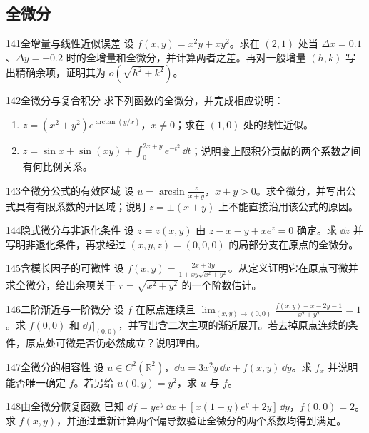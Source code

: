 \subsection{全微分}
\begin{exercise}{141}{全增量与线性近似误差}
设 $f(x,y)=x^2y+xy^2$。求在 $(2,1)$ 处当 $\Delta x=0.1$、$\Delta y=-0.2$ 时的全增量和全微分，并计算两者之差。再对一般增量 $(h,k)$ 写出精确余项，证明其为 $o(\sqrt{h^2+k^2})$。
\end{exercise}
\begin{exercise}{142}{全微分与复合积分}
求下列函数的全微分，并完成相应说明：
\begin{enumerate}
\item $z=(x^2+y^2)e^{\arctan(y/x)}$，$x\ne0$；求在 $(1,0)$ 处的线性近似。
\item $z=\sin x+\sin(xy)+\int_0^{2x+y}e^{-t^2}\,\dd t$；说明变上限积分贡献的两个系数之间有何比例关系。
\end{enumerate}
\end{exercise}
\begin{exercise}{143}{全微分公式的有效区域}
设 $u=\arcsin\frac z{x+y}$，$x+y>0$。求全微分，并写出公式具有有限系数的开区域；说明 $z=\pm(x+y)$ 上不能直接沿用该公式的原因。
\end{exercise}
\begin{exercise}{144}{隐式微分与非退化条件}
设 $z=z(x,y)$ 由 $z-x-y+xe^z=0$ 确定。求 $\dd z$ 并写明非退化条件，再求经过 $(x,y,z)=(0,0,0)$ 的局部分支在原点的全微分。
\end{exercise}
\begin{exercise}{145}{含模长因子的可微性}
设 $f(x,y)=\frac{2x+3y}{1+xy\sqrt{x^2+y^2}}$。从定义证明它在原点可微并求全微分，给出余项关于 $r=\sqrt{x^2+y^2}$ 的一个阶数估计。
\end{exercise}
\begin{exercise}{146}{二阶渐近与一阶微分}
设 $f$ 在原点连续且 $\lim_{(x,y)\to(0,0)}\frac{f(x,y)-x-2y-1}{x^2+y^2}=1$。求 $f(0,0)$ 和 $\dd f|_{(0,0)}$，并写出含二次主项的渐近展开。若去掉原点连续的条件，原点处可微是否仍必然成立？说明理由。
\end{exercise}
\begin{exercise}{147}{全微分的相容性}
设 $u\in C^2(\mathbb R^2)$，$\dd u=3x^2y\,\dd x+f(x,y)\,\dd y$。求 $f_x$ 并说明能否唯一确定 $f$。若另给 $u(0,y)=y^2$，求 $u$ 与 $f$。
\end{exercise}
\begin{exercise}{148}{由全微分恢复函数}
已知 $\dd f=ye^y\,\dd x+[x(1+y)e^y+2y]\,\dd y$，$f(0,0)=2$。求 $f(x,y)$，并通过重新计算两个偏导数验证全微分的两个系数均得到满足。
\end{exercise}
